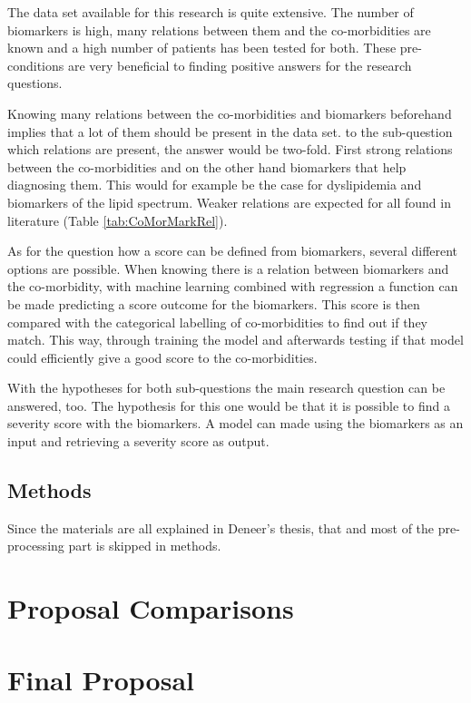 \documentclass[10pt,a4paper]{article}
\begin{document}
	The data set available for this research is quite extensive. The number of biomarkers is high, many relations between them and the co-morbidities are known and a high number of patients has been tested for both. These pre-conditions are very beneficial to finding positive answers for the research questions.
	
	Knowing many relations between the co-morbidities and biomarkers beforehand implies that a lot of them should be present in the data set. to the sub-question which relations are present, the answer would be two-fold. First strong relations between the co-morbidities and on the other hand biomarkers that help diagnosing them. This would for example be the case for dyslipidemia and biomarkers of the lipid spectrum. Weaker relations are expected for all found in literature (Table \ref{tab:CoMorMarkRel}).
	
	As for the question how a score can be defined from biomarkers, several different options are possible. When knowing there is a relation between biomarkers and the co-morbidity, with machine learning combined with regression a function can be made predicting a score outcome for the biomarkers. This score is then compared with the categorical labelling of co-morbidities to find out if they match. This way, through training the model and afterwards testing if that model could efficiently give a good score to the co-morbidities.
	
	With the hypotheses for both sub-questions the main research question can be answered, too. The hypothesis for this one would be that it is possible to find a severity score with the biomarkers. A model can made using the biomarkers as an input and retrieving a severity score as output.
	
	\subsection{Methods}
	
	Since the materials are all explained in Deneer's thesis, that and most of the pre-processing part is skipped in methods.
	
	\section{Proposal Comparisons}
	
	\section{Final Proposal}
	
	 
	
	
\end{document}
